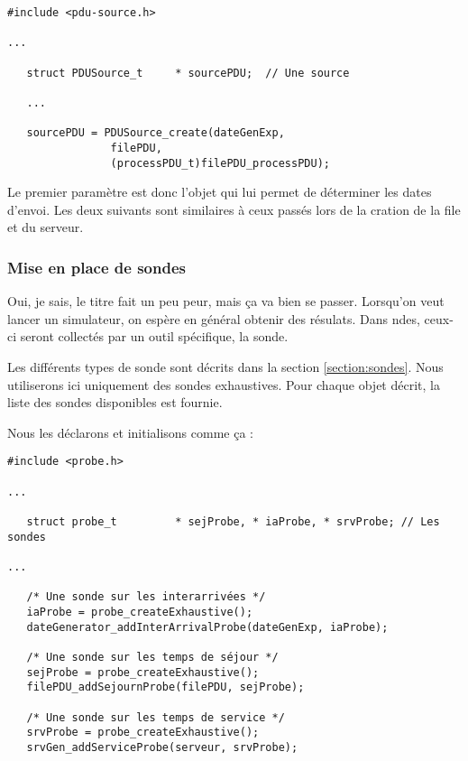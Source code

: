 \begin{verbatim}
#include <pdu-source.h>

...

   struct PDUSource_t     * sourcePDU;  // Une source

   ...

   sourcePDU = PDUSource_create(dateGenExp, 
				filePDU,
				(processPDU_t)filePDU_processPDU);
\end{verbatim}

   Le premier paramètre est donc l'objet qui lui permet de déterminer
les dates d'envoi. Les deux suivants sont similaires à ceux passés
lors de la cration de la file et du serveur.
   
%
\subsubsection{Mise en place de sondes}

   Oui, je sais, le titre fait un peu peur, mais ça va bien se
passer. Lorsqu'on veut lancer un simulateur, on espère en général
obtenir des résulats. Dans {\sc ndes}, ceux-ci seront collectés par un
outil spécifique, la sonde.

   Les différents types de sonde sont décrits dans la section
\ref{section:sondes}. Nous utiliserons ici uniquement des sondes
exhaustives. Pour chaque objet décrit, la liste des sondes
disponibles est fournie. 

   Nous les déclarons et initialisons comme ça :

\begin{verbatim}
#include <probe.h>

...

   struct probe_t         * sejProbe, * iaProbe, * srvProbe; // Les sondes

...

   /* Une sonde sur les interarrivées */
   iaProbe = probe_createExhaustive();
   dateGenerator_addInterArrivalProbe(dateGenExp, iaProbe);

   /* Une sonde sur les temps de séjour */
   sejProbe = probe_createExhaustive();
   filePDU_addSejournProbe(filePDU, sejProbe);

   /* Une sonde sur les temps de service */
   srvProbe = probe_createExhaustive();
   srvGen_addServiceProbe(serveur, srvProbe);
\end{verbatim}

